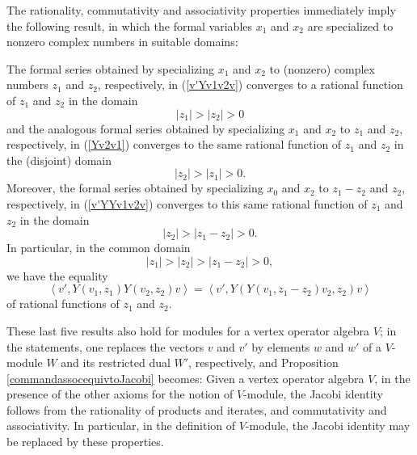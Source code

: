 \documentclass[12pt]{article}
\begin{document}
The rationality, commutativity and associativity properties
immediately imply the following result, in which the formal variables
$x_1$ and $x_2$ are specialized to nonzero complex numbers in suitable
domains:

\begin{corol}\label{dualitywithcovergence}
The formal series obtained by specializing $x_1$ and $x_2$ to
(nonzero) complex numbers $z_1$ and $z_2$, respectively, in
(\ref{v'Yv1v2v}) converges to a rational function of $z_1$ and $z_2$
in the domain
\begin{equation}
|z_1| > |z_2| > 0       
\end{equation}
and the analogous formal series obtained by specializing $x_1$ and
$x_2$ to $z_1$ and $z_2$, respectively, in (\ref{Yv2v1}) converges to
the same rational function of $z_1$ and $z_2$ in the (disjoint) domain
\begin{equation}
|z_2| > |z_1| > 0. 
\end{equation}
Moreover, the formal series obtained by specializing $x_0$ and $x_2$
to $z_1-z_2$ and $z_2$, respectively, in (\ref{v'YYv1v2v}) converges
to this same rational function of $z_1$ and $z_2$ in the domain
\begin{equation}
|z_2| > |z_1-z_2| > 0. 
\end{equation}
In particular, in the common domain
\begin{equation}
|z_1| > |z_2| > |z_1-z_2| > 0,
\end{equation}
we have the equality
\begin{equation}\label{associativitywithz1,z2}
\left\langle v', Y(v_{1}, z_{1})Y(v_{2}, z_{2})v\right\rangle=
\left\langle v', Y(Y(v_{1}, z_1-z_2)v_{2},z_{2})v\right\rangle
\end{equation}
of rational functions of $z_1$ and $z_2$.
\end{corol}

\begin{rema}{\rm
These last five results also hold for modules for a vertex operator
algebra $V$; in the statements, one replaces the vectors $v$ and $v'$
by elements $w$ and $w'$ of a $V$-module $W$ and its restricted dual
$W'$, respectively, and Proposition \ref{commandassocequivtoJacobi}
becomes: Given a vertex operator algebra $V$, in the presence of the
other axioms for the notion of $V$-module, the Jacobi identity follows
{from} the rationality of products and iterates, and commutativity and
associativity.  In particular, in the definition of $V$-module, the
Jacobi identity may be replaced by these properties.  }
\end{rema}
\end{document}
